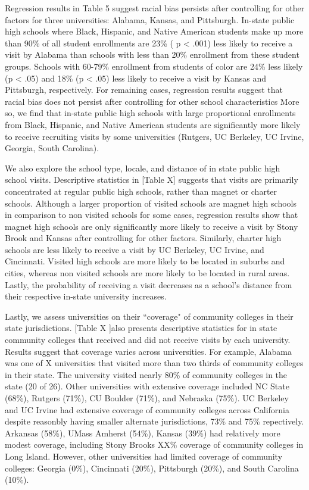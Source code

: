 \documentclass[twoside]{article}
\begin{document}
Regression results in Table 5 suggest racial bias persists after controlling for other factors for three universities: Alabama, Kansas, and Pittsburgh. In-state public high schools where Black, Hispanic, and Native American students make up more than  90\% of all student enrollments are 23\% ( p < .001) less likely to receive a visit by Alabama than schools with less than 20\% enrollment from these student groups. Schools with 60-79\% enrollment from students of color are 24\% less likely (p < .05) and 18\% (p < .05) less likely to receive a visit by Kansas and Pittsburgh, respectively. For remaining cases, regression results suggest that racial bias does not persist after controlling for other school characteristics More so, we find that in-state public high schools with large proportional enrollments from Black, Hispanic, and Native American students are significantly more likely to receive recruiting visits by some universities (Rutgers, UC Berkeley, UC Irvine, Georgia, South Carolina).

We also explore the school type, locale, and distance of in state public high school visits. Descriptive statistics in [Table X] suggests that visits are primarily concentrated at regular public high schools, rather than magnet or charter schools. Although a larger proportion of visited schools are magnet high schools in comparison to non visited schools for some cases, regression results show that magnet high schools are only significantly more likely to receive a visit by Stony Brook and Kansas after controlling for other factors. Similarly, charter high schools are less likely to receive a visit by UC Berkeley, UC Irvine, and Cincinnati. Visited high schools are more likely to be located in suburbs and cities, whereas non visited schools are more likely to be located in rural areas.  Lastly, the probability of receiving a visit decreases as a school’s distance from their respective in-state university increases.

Lastly, we assess universities on their ``coverage" of community colleges in their state jurisdictions. [Table X ]also presents descriptive statistics for in state community colleges that received and did not receive visits by each university. Results suggest that coverage varies across universities. For example, Alabama was one of X universities that visited more than two thirds of community colleges in their state. The university visited nearly 80\% of community colleges in the state (20 of 26). Other universities with extensive coverage included NC State (68\%), Rutgers (71\%), CU Boulder (71\%), and Nebraska (75\%).  UC Berkeley and UC Irvine had extensive coverage of community colleges across California despite reasonbly having smaller alternate jurisdictions, 73\% and 75\% repectively. Arkansas (58\%), UMass Amherst (54\%), Kansas (39\%) had relatively more modest coverage, including Stony Brooks XX\% coverage of community colleges in Long Island. However, other universities had limited coverage of community colleges: Georgia (0\%), Cincinnati (20\%), Pittsburgh (20\%), and South Carolina (10\%). 
\end{document}
